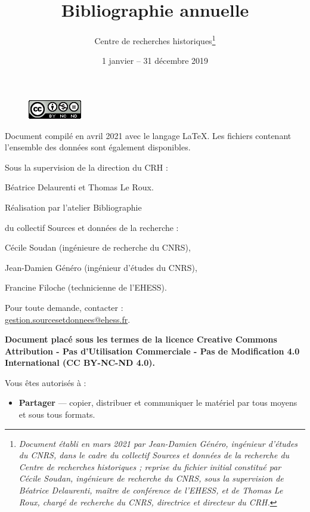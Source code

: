 \documentclass{article}
\title{\textbf{Bibliographie annuelle}}
\author{Centre de recherches historiques\footnote{\textit{Document établi en mars 2021 par Jean-Damien Généro, ingénieur d'études du CNRS, dans le cadre du collectif Sources et données de la recherche du Centre de recherches historiques ; reprise du fichier initial constitué par Cécile Soudan, ingénieure de recherche du CNRS, sous la supervision de Béatrice Delaurenti, maître de conférence de l'EHESS, et de 
Thomas Le Roux, chargé de recherche du CNRS, directrice et directeur du CRH.}}}
\date{1\up{er} janvier -- 31 décembre 2019}
\begin{document}
\renewcommand{\contentsname}{Sommaire}


\newpage
\thispagestyle{empty}

\begin{figure}
    \centering
    \includegraphics{img/licence-cc-icon.png}
    \label{fig:licence}
\end{figure}

\bigskip

\bigskip
\begin{center}
\begin{itshape}

Document compilé en avril 2021 avec le langage \LaTeX. Les fichiers  contenant l'ensemble des données sont également disponibles.

\medskip

Sous la supervision de la direction du CRH :

Béatrice Delaurenti et Thomas Le Roux.

\medskip

Réalisation par l'atelier \og Bibliographie \fg

du collectif \og Sources et données de la recherche \fg :

Cécile Soudan (ingénieure de recherche du CNRS),

Jean-Damien Généro (ingénieur d’études du CNRS),

Francine Filoche (technicienne de l’EHESS).

\medskip

Pour toute demande, contacter :\\\url{gestion.sourcesetdonnees@ehess.fr}.

\end{itshape}

\bigskip

\bigskip

    \textbf{Document placé sous les termes de la licence Creative Commons Attribution - Pas d'Utilisation Commerciale - Pas de Modification 4.0 International (CC BY-NC-ND 4.0).}
\end{center}

\bigskip

    Vous êtes autorisés à :
    \begin{itemize}
        \item \textbf{Partager} --- copier, distribuer et communiquer le matériel par tous moyens et sous tous formats.
    \end{itemize}
\end{document}
